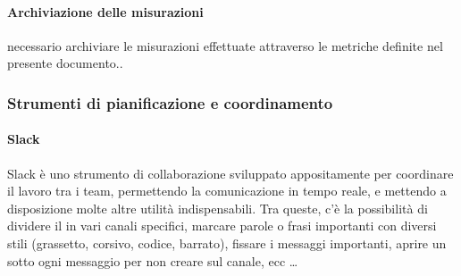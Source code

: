     		\paragraph{Archiviazione delle misurazioni} %
    		necessario archiviare le misurazioni effettuate attraverso le metriche definite nel presente documento..

    	\subsubsection{Strumenti di pianificazione e coordinamento}\label{pianificazione e coordinamento}

    		\paragraph{Slack} %
			Slack è uno strumento di collaborazione sviluppato appositamente per coordinare il lavoro tra i team, permettendo la comunicazione in tempo
			reale, e mettendo a disposizione molte altre utilità indispensabili. Tra queste, c'è la possibilità di dividere il  in vari canali
			specifici, marcare parole o frasi importanti con diversi stili (grassetto, corsivo, codice, barrato), fissare i messaggi importanti, aprire un 
			sotto ogni messaggio per non creare  sul canale, ecc \dots


